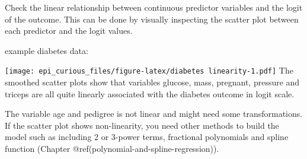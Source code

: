 \documentclass[
]{article}
\newenvironment{Shaded}{\begin{snugshade}}{\end{snugshade}}
\newcommand{\CommentTok}[1]{\textcolor[rgb]{0.56,0.35,0.01}{\textit{#1}}}
\newcommand{\DataTypeTok}[1]{\textcolor[rgb]{0.13,0.29,0.53}{#1}}
\newcommand{\DecValTok}[1]{\textcolor[rgb]{0.00,0.00,0.81}{#1}}
\newcommand{\FloatTok}[1]{\textcolor[rgb]{0.00,0.00,0.81}{#1}}
\newcommand{\KeywordTok}[1]{\textcolor[rgb]{0.13,0.29,0.53}{\textbf{#1}}}
\newcommand{\NormalTok}[1]{#1}
\newcommand{\OperatorTok}[1]{\textcolor[rgb]{0.81,0.36,0.00}{\textbf{#1}}}
\newcommand{\StringTok}[1]{\textcolor[rgb]{0.31,0.60,0.02}{#1}}
\begin{document}
Check the linear relationship between continuous predictor variables and
the logit of the outcome. This can be done by visually inspecting the
scatter plot between each predictor and the logit values.

example diabetes data:

\begin{Shaded}
\end{Shaded}

\texttt{[image: epi\_curious\_files/figure-latex/diabetes linearity-1.pdf]}
The smoothed scatter plots show that variables glucose, mass, pregnant,
pressure and triceps are all quite linearly associated with the diabetes
outcome in logit scale.

The variable age and pedigree is not linear and might need some
transformations. If the scatter plot shows non-linearity, you need other
methods to build the model such as including 2 or 3-power terms,
fractional polynomials and spline function (Chapter
@ref(polynomial-and-spline-regression)).
\end{document}
